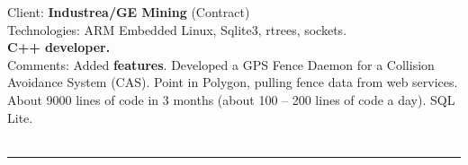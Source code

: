 \documentclass{article}
\begin{document}
%
%

Client: 	\textbf  {Industrea/GE Mining} (Contract) \\
Technologies: 	ARM Embedded Linux, Sqlite3, rtrees, sockets. \\
\textbf{ C++ developer.  }\\
Comments:	Added {\bf features}. Developed a GPS Fence Daemon for a Collision Avoidance System (CAS). Point in Polygon, pulling fence data from web services. About 9000 lines of code in 3 months (about 100 – 200 lines of code a day).
	SQL Lite. \\
\\

\noindent\hfil\rule{0.5\textwidth}{.4pt}\hfil
\\


\end{document}
